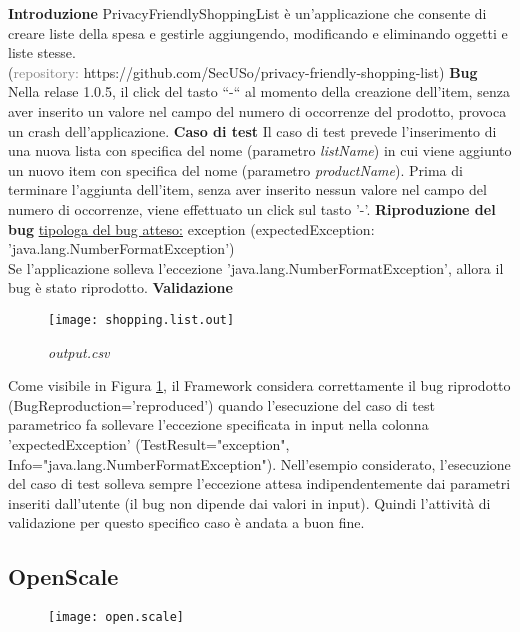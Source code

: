 \noindent\textbf{Introduzione}\newline
PrivacyFriendlyShoppingList è un’applicazione che consente di creare liste della spesa e gestirle aggiungendo, modificando e eliminando oggetti e liste stesse.\\ (\textcolor{gray}{repository: }https://github.com/SecUSo/privacy-friendly-shopping-list)
\bigskip\newline
\noindent\textbf{Bug}\newline
Nella relase 1.0.5, il click del tasto “-“ al momento della creazione dell’item, senza aver inserito un valore nel campo del numero di occorrenze del prodotto, provoca un crash dell’applicazione.
\bigskip\newline
\noindent\textbf{Caso di test}\newline
Il caso di test prevede l'inserimento di una nuova lista con specifica del nome (parametro \emph{listName}) in cui viene aggiunto un nuovo item con specifica del nome (parametro \emph{productName}). Prima di terminare l'aggiunta dell'item, senza aver inserito nessun valore nel campo del numero di occorrenze, viene effettuato un click sul tasto '-'.
\bigskip\newline
\noindent\textbf{Riproduzione del bug}\newline
\noindent\ul{tipologa del bug atteso:} exception (expectedException: 'java.lang.NumberFormatException')\\
\noindent Se l'applicazione solleva l'eccezione 'java.lang.NumberFormatException', allora il bug è stato riprodotto.
\bigskip\newline
\noindent\textbf{Validazione}
 \begin{figure}[H]
	\texttt{[image: shopping.list.out]}
	\centering
			\caption{\emph{output.csv}}
    \label{fig:shopping.list}
\end{figure}
\noindent Come visibile in Figura \ref{fig:shopping.list}, il Framework considera correttamente il bug riprodotto  (BugReproduction='reproduced') quando l'esecuzione del caso di test parametrico fa sollevare l'eccezione specificata in input nella colonna 'expectedException' (TestResult="exception", Info="java.lang.NumberFormatException"). Nell'esempio considerato, l'esecuzione del caso di test solleva sempre l'eccezione attesa indipendentemente dai parametri inseriti dall'utente (il bug non dipende dai valori in input). Quindi l'attività di validazione per questo specifico caso è andata a buon fine.


\subsection{OpenScale}
 \begin{figure}[H]
	\texttt{[image: open.scale]}
	\centering
\end{figure}

